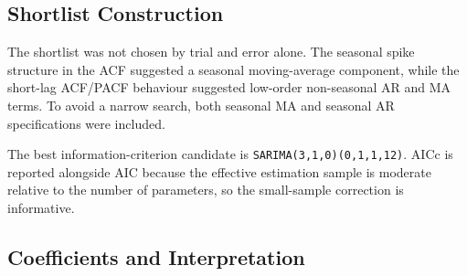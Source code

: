\documentclass[runningheads]{llncs}
\begin{document}
\subsection{Shortlist Construction}
The shortlist was not chosen by trial and error alone. The seasonal spike structure in the ACF suggested a seasonal moving-average component, while the short-lag ACF/PACF behaviour suggested low-order non-seasonal AR and MA terms. To avoid a narrow search, both seasonal MA and seasonal AR specifications were included.

\begin{table}[tbp]
\caption{SARIMA shortlist with information criteria and Ljung-Box diagnostics.}
\label{tab:sarima_shortlist}
\centering
{}
\end{table}

The best information-criterion candidate is \texttt{SARIMA(3,1,0)(0,1,1,12)}. AICc is reported alongside AIC because the effective estimation sample is moderate relative to the number of parameters, so the small-sample correction is informative.

\subsection{Coefficients and Interpretation}
\begin{table}[tbp]
\caption{Coefficient estimates for the selected SARIMA model.}
\label{tab:sarima_coef}
\centering
{}
\end{table}
\end{document}
